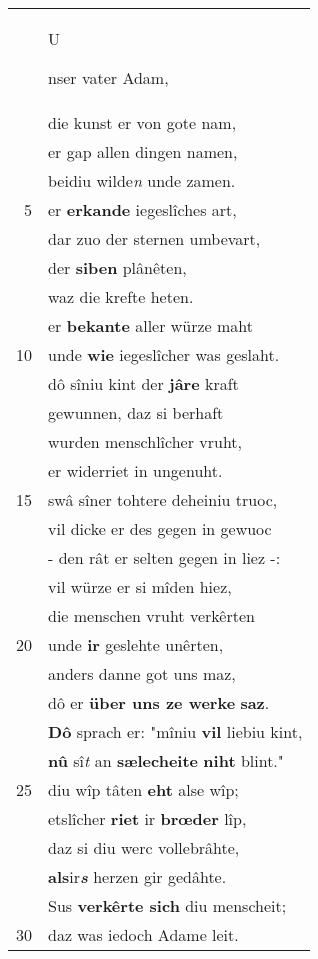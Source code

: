 \documentclass[8pt,a4paper,notitlepage]{article}
\begin{document}
\begin{table}[ht]
\begin{minipage}[t]{0.5\linewidth}
\begin{tabular}{rl}
 & \begin{large}U\end{large}nser vater Adam,\\ 
 & die kunst er von gote nam,\\ 
 & er gap allen dingen namen,\\ 
 & beidiu wilde\textit{n} unde zamen.\\ 
5 & er \textbf{erkande} iegeslîches art,\\ 
 & dar zuo der sternen umbevart,\\ 
 & der \textbf{siben} plânêten,\\ 
 & waz die krefte heten.\\ 
 & er \textbf{bekante} aller würze maht\\ 
10 & unde \textbf{wie} iegeslîcher was geslaht.\\ 
 & dô sîniu kint der \textbf{jâre} kraft\\ 
 & gewunnen, daz si berhaft\\ 
 & wurden menschlîcher vruht,\\ 
 & er widerriet in ungenuht.\\ 
15 & swâ sîner tohtere deheiniu truoc,\\ 
 & vil dicke er des gegen in gewuoc\\ 
 & - den rât er selten gegen in liez -:\\ 
 & vil würze er si mîden hiez,\\ 
 & die menschen vruht verkêrten\\ 
20 & unde \textbf{ir} geslehte unêrten,\\ 
 & anders danne got uns maz,\\ 
 & dô er \textbf{über uns ze werke} \textbf{saz}.\\ 
 & \textbf{Dô} sprach er: "mîniu \textbf{vil} liebiu kint,\\ 
 & \textbf{nû} sî\textit{t} an \textbf{sælecheite} \textbf{niht} blint."\\ 
25 & diu wîp tâten \textbf{eht} alse wîp;\\ 
 & etslîcher \textbf{riet} ir \textbf{brœder} lîp,\\ 
 & daz si diu werc vollebrâhte,\\ 
 & \textbf{als}ir\textit{\textbf{s}} herzen gir gedâhte.\\ 
 & Sus \textbf{verkêrte sich} diu menscheit;\\ 
30 & daz was iedoch Adame leit.\\ 

\end{tabular}
\end{minipage}
\end{table}
\end{document}
